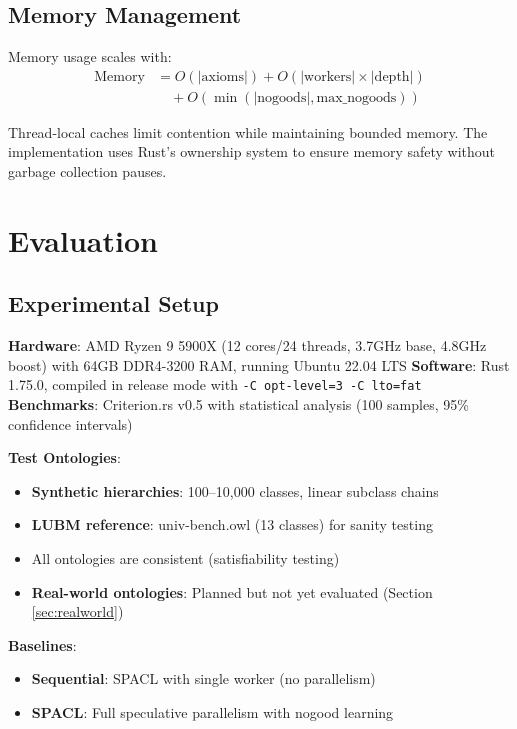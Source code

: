 \documentclass[preprint,12pt]{elsarticle}
\begin{document}
\subsection{Memory Management}
\label{sec:memory}

Memory usage scales with:
\begin{align}
\text{Memory} &= O(|\text{axioms}|) + O(|\text{workers}| \times |\text{depth}|) \\
&\quad + O(\min(|\text{nogoods}|, \text{max\_nogoods}))
\end{align}

Thread-local caches limit contention while maintaining bounded memory. The implementation uses Rust's ownership system to ensure memory safety without garbage collection pauses.

\section{Evaluation}
\label{sec:evaluation}

\subsection{Experimental Setup}
\label{sec:setup}

\textbf{Hardware}: AMD Ryzen 9 5900X (12 cores/24 threads, 3.7GHz base, 4.8GHz boost) with 64GB DDR4-3200 RAM, running Ubuntu 22.04 LTS  
\textbf{Software}: Rust 1.75.0, compiled in release mode with \texttt{-C opt-level=3 -C lto=fat}  
\textbf{Benchmarks}: Criterion.rs v0.5 with statistical analysis (100 samples, 95\% confidence intervals)

\textbf{Test Ontologies}:
\begin{itemize}
    \item \textbf{Synthetic hierarchies}: 100--10,000 classes, linear subclass chains
    \item \textbf{LUBM reference}: univ-bench.owl (13 classes) for sanity testing
    \item All ontologies are consistent (satisfiability testing)
    \item \textbf{Real-world ontologies}: Planned but not yet evaluated (Section \ref{sec:realworld})
\end{itemize}

\textbf{Baselines}:
\begin{itemize}
    \item \textbf{Sequential}: SPACL with single worker (no parallelism)
    \item \textbf{SPACL}: Full speculative parallelism with nogood learning
\end{itemize}
\end{document}
